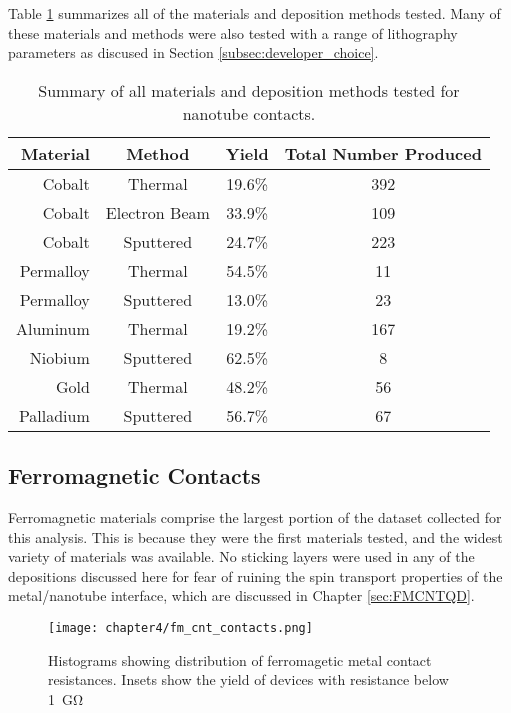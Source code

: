 Table \ref{table:all_contact_results} summarizes all of the materials and deposition methods tested. Many of these materials and methods were also tested with a range of lithography parameters as discused in Section \ref{subsec:developer_choice}. 

\begin{table}
    \centering
    \caption{Summary of all materials and deposition methods tested for nanotube contacts.}
    \begin{tabular}{ r | c c c}
        Material & Method & Yield & Total Number Produced \\ \hline
        Cobalt & Thermal & 19.6\% & 392 \\ 
        Cobalt & Electron Beam & 33.9\% & 109 \\ 
        Cobalt & Sputtered & 24.7\% & 223 \\ 
        Permalloy & Thermal & 54.5\% & 11 \\
        Permalloy & Sputtered & 13.0\% & 23 \\
        Aluminum & Thermal & 19.2\% & 167 \\
        Niobium & Sputtered & 62.5\% & 8 \\
        Gold & Thermal & 48.2\% & 56 \\
        Palladium & Sputtered & 56.7\% & 67
    \end{tabular}
    \label{table:all_contact_results}  
\end{table}

\subsection{Ferromagnetic Contacts}

Ferromagnetic materials comprise the largest portion of the dataset collected for this analysis. This is because they were the first materials tested, and the widest variety of materials was available. No sticking layers were used in any of the depositions discussed here for fear of ruining the spin transport properties of the metal/nanotube interface, which are discussed in Chapter \ref{sec:FMCNTQD}.

\begin{figure}
    \centering
    \texttt{[image: chapter4/fm\_cnt\_contacts.png]}
    \caption{Histograms showing distribution of ferromagetic metal contact resistances. Insets show the yield of devices with resistance below \SI{1}{\giga\ohm}}
    \label{fig:fm_contacts}
\end{figure}

